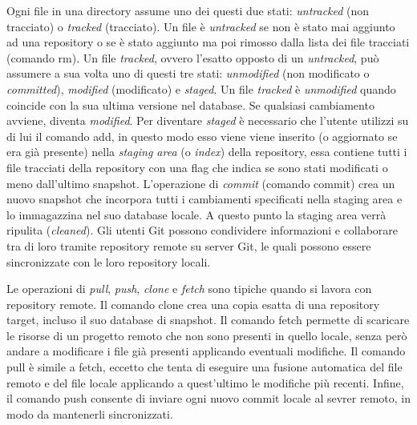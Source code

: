 Ogni file in una directory assume uno dei questi due stati:
\emph{untracked} (non tracciato) o \emph{tracked} (tracciato).
Un file è \emph{untracked} se non è stato mai aggiunto ad una repository o se è stato
aggiunto ma poi rimosso dalla lista dei file tracciati (comando \textsf{rm}).
Un file \emph{tracked}, ovvero l'esatto opposto di un \emph{untracked}, può assumere a sua volta uno di questi tre
stati: \emph{unmodified} (non modificato o \emph{committed}), \emph{modified} (modificato) e \emph{staged}.
Un file \emph{tracked} è \emph{unmodified} quando coincide con la sua ultima versione nel database.
Se qualsiasi cambiamento avviene, diventa \emph{modified}.
Per diventare \emph{staged} è necessario che l'utente utilizzi su di lui il comando \textsf{add},
in questo modo esso viene viene inserito (o aggiornato se era già presente) nella \emph{staging area}
(o \emph{index}) della repository, essa contiene tutti i file tracciati della repository con una flag
che indica se sono stati modificati o meno dall'ultimo snapshot.
L'operazione di \emph{commit} (comando \textsf{commit}) crea un nuovo snapshot che incorpora
tutti i cambiamenti specificati nella staging area e lo immagazzina nel suo database locale.
A questo punto la staging area verrà ripulita (\emph{cleaned}).
Gli utenti Git possono condividere informazioni e collaborare tra di loro tramite repository remote
su server Git, le quali possono essere sincronizzate con le loro repository locali.

Le operazioni di \emph{pull}, \emph{push}, \emph{clone} e \emph{fetch}
sono tipiche quando si lavora con repository remote.
Il comando \textsf{clone} crea una copia esatta di una repository target,
incluso il suo database di snapshot.
Il comando \textsf{fetch} permette di scaricare le risorse di un progetto remoto che non sono
presenti in quello locale, senza però andare a modificare i file già presenti
applicando eventuali modifiche.
Il comando \textsf{pull} è simile a \textsf{fetch}, eccetto che tenta di eseguire una fusione
automatica del file remoto e del file locale applicando a quest'ultimo le modifiche più recenti.
Infine, il comando \textsf{push} consente di inviare ogni nuovo commit locale al sevrer remoto,
in modo da mantenerli sincronizzati.


